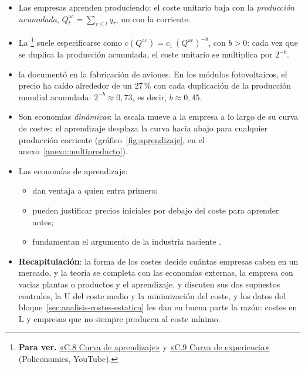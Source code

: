 \documentclass[11pt]{article}
\begin{document}
\begin{itemize}
\item Las empresas aprenden produciendo: el coste unitario baja con la \emph{producción acumulada}, $Q^{\mathrm{ac}}_t=\sum_{\tau\leq t}q_\tau$, no con la corriente.
\item La \footnote{\textbf{Para ver.} \href{https://www.youtube.com/watch?v=bW04hiQWCE4}{«C.8 Curva de aprendizaje»} y \href{https://www.youtube.com/watch?v=2OEw3bF7cR8}{«C.9 Curva de experiencia»} (Policonomics, YouTube).} suele especificarse como $c(Q^{\mathrm{ac}})=c_1\,(Q^{\mathrm{ac}})^{-b}$, con $b>0$: cada vez que se duplica la producción acumulada, el coste unitario se multiplica por $2^{-b}$.
\item \textcite{Wright1936Factors} la documentó en la fabricación de aviones. En los módulos fotovoltaicos, el precio ha caído alrededor de un 27\,\% con cada duplicación de la producción mundial acumulada\nocite{FraunhoferISE2026Photovoltaics}: $2^{-b}\approx 0{,}73$, es decir, $b\approx 0{,}45$.
\item Son economías \emph{dinámicas}: la escala mueve a la empresa a lo largo de su curva de costes; el aprendizaje desplaza la curva hacia abajo para cualquier producción corriente (gráfico~\ref{fig:aprendizaje}, en el anexo~\ref{anexo:multiproducto}).
\item Las economías de aprendizaje:
  \begin{itemize}
  \item dan ventaja a quien entra primero;
  \item pueden justificar precios iniciales por debajo del coste para aprender antes;
  \item fundamentan el argumento de la industria naciente .
  \end{itemize}
\end{itemize}

\begin{itemize}
\item \textbf{Recapitulación}: la forma de los costes decide cuántas empresas caben en un mercado, y la teoría se completa con las economías externas, la empresa con varias plantas o productos y el aprendizaje.  y  discuten sus dos supuestos centrales, la U del coste medio y la minimización del coste, y los datos del bloque~\ref{sec:analisis-costes-estatica} les dan en buena parte la razón: costes en L y empresas que no siempre producen al coste mínimo.
\end{itemize}
\end{document}
